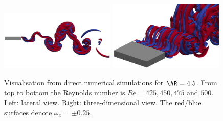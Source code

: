 \begin{figure}
  \includegraphics[trim={0 250 0 200},clip,width=0.49\textwidth]{./fig/AR4p5/omegax_Re500_2D.png}
  \includegraphics[trim={10 0 10 0},clip,width=0.49\textwidth]{./fig/AR4p5/omegax_Re500_3D.png} 
  \caption{Visualisation from direct numerical simulations for $\AR=4.5$. From top to bottom the Reynolds number is $Re=425,450,475$ and $500$. Left: lateral view. Right: three-dimensional view. The red/blue surfaces denote $\omega_x = \pm 0.25$.}
  \label{fig:viewdns-ar4p5}       
\end{figure}


